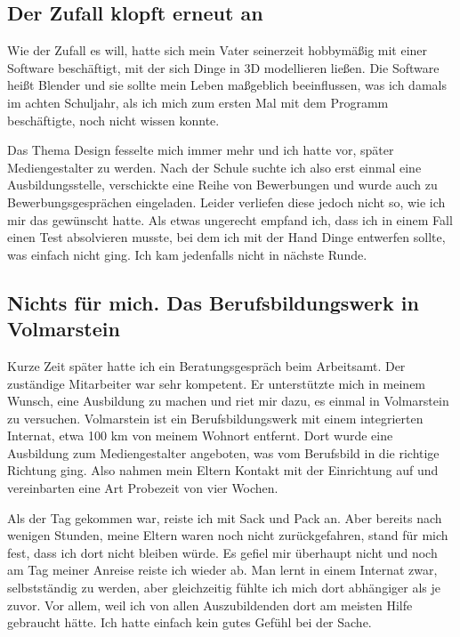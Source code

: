 \documentclass[fontsize=14pt,a4paper,headinclude,DIV=calc,automark]{scrbook}
\begin{document}
\subsection{Der Zufall klopft erneut an}

Wie der Zufall es will, hatte sich mein Vater seinerzeit hobbymäßig mit einer Software beschäftigt, mit der sich Dinge in 3D modellieren ließen. Die Software heißt Blender und sie sollte mein Leben maßgeblich beeinflussen, was ich damals im achten Schuljahr, als ich mich zum ersten Mal mit dem Programm beschäftigte, noch nicht wissen konnte.

Das Thema Design fesselte mich immer mehr und ich hatte vor, später Mediengestalter zu werden. Nach der Schule suchte ich also erst einmal eine Ausbildungsstelle, verschickte eine Reihe von Bewerbungen und wurde auch zu Bewerbungsgesprächen eingeladen. Leider verliefen diese jedoch nicht so, wie ich mir das gewünscht hatte. Als etwas ungerecht empfand ich, dass ich in einem Fall einen Test absolvieren musste, bei dem ich mit der Hand Dinge entwerfen sollte, was einfach nicht ging. Ich kam jedenfalls nicht in nächste Runde.

\subsection{Nichts für mich. Das Berufsbildungswerk in Volmarstein}

Kurze Zeit später hatte ich ein Beratungsgespräch beim Arbeitsamt. Der zuständige Mitarbeiter war sehr kompetent. Er unterstützte mich in meinem Wunsch, eine Ausbildung zu machen und riet mir dazu, es einmal in Volmarstein zu versuchen. Volmarstein ist ein Berufsbildungswerk mit einem integrierten Internat, etwa 100 km von meinem Wohnort entfernt. Dort wurde eine Ausbildung zum Mediengestalter angeboten, was vom Berufsbild in die richtige Richtung ging. Also nahmen mein Eltern Kontakt mit der Einrichtung auf und vereinbarten eine Art Probezeit von vier Wochen.

Als der Tag gekommen war, reiste ich mit Sack und Pack an. Aber bereits nach wenigen Stunden, meine Eltern waren noch nicht zurückgefahren, stand für mich fest, dass ich dort nicht bleiben würde. Es gefiel mir überhaupt nicht und noch am Tag meiner Anreise reiste ich wieder ab. Man lernt in einem Internat zwar, selbstständig zu werden, aber gleichzeitig fühlte ich mich dort abhängiger als je zuvor. Vor allem, weil ich von allen Auszubildenden dort am meisten Hilfe gebraucht hätte. Ich hatte einfach kein gutes Gefühl bei der Sache.
\end{document}
